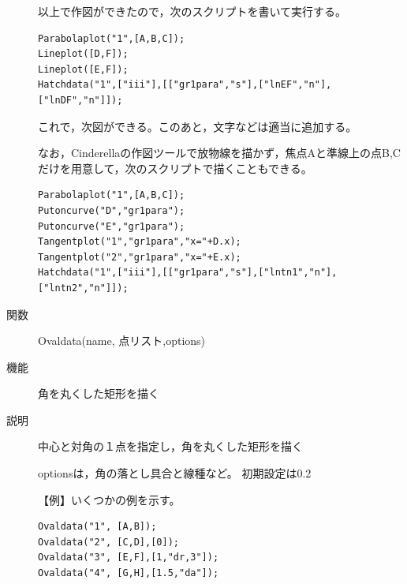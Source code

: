 \documentclass[papersize,a4paper,12pt,uplatex]{jsarticle}
\begin{document}
\begin{description}
\vspace{\baselineskip}
以上で作図ができたので，次のスクリプトを書いて実行する。
\begin{verbatim}
Parabolaplot("1",[A,B,C]);
Lineplot([D,F]);
Lineplot([E,F]);
Hatchdata("1",["iii"],[["gr1para","s"],["lnEF","n"],["lnDF","n"]]);
\end{verbatim}

これで，次図ができる。このあと，文字などは適当に追加する。
 
\vspace{\baselineskip}
\begin{center} \end{center}

なお，Cinderellaの作図ツールで放物線を描かず，焦点Aと準線上の点B,Cだけを用意して，次のスクリプトで描くこともできる。
\begin{verbatim}
Parabolaplot("1",[A,B,C]);
Putoncurve("D","gr1para");
Putoncurve("E","gr1para");
Tangentplot("1","gr1para","x="+D.x);
Tangentplot("2","gr1para","x="+E.x);
Hatchdata("1",["iii"],[["gr1para","s"],["lntn1","n"],["lntn2","n"]]);
\end{verbatim}


\hypertarget{ovaldata}{}
\item[関数]Ovaldata(name, 点リスト,options)
\item[機能]角を丸くした矩形を描く
\item[説明]中心と対角の１点を指定し，角を丸くした矩形を描く

optionsは，角の落とし具合と線種など。 初期設定は0.2 

\vspace{\baselineskip}
【例】いくつかの例を示す。
\begin{verbatim}
Ovaldata("1", [A,B]);
Ovaldata("2", [C,D],[0]);
Ovaldata("3", [E,F],[1,"dr,3"]);
Ovaldata("4", [G,H],[1.5,"da"]);
\end{verbatim}
\begin{center} \scalebox{0.9}{}\end{center}

\end{description}
\end{document}
